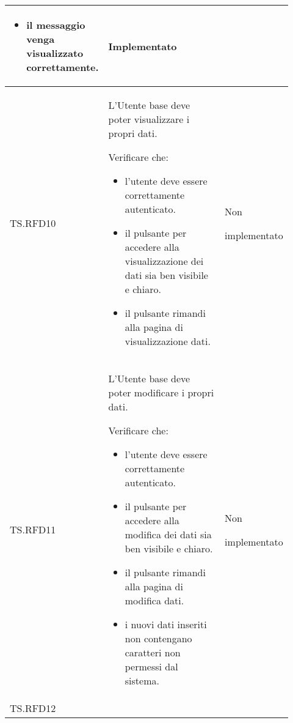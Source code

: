 \begin{longtable}{|p{0.10\linewidth}|p{0.70\linewidth}|p{0.12\linewidth}|}
\begin{itemize}
		\item il messaggio venga visualizzato correttamente.
	\end{itemize}                                      &
	Implementato                                                                                                                                                            \\
	\hline
	TS.RFD10                                                                                                                        &
	L'Utente base deve poter visualizzare i propri dati. \par
	Verificare che:
	\begin{itemize}
		\item l'utente deve essere correttamente autenticato.
		\item il pulsante per accedere alla visualizzazione dei dati sia ben visibile e chiaro.
		\item il pulsante rimandi alla pagina di visualizzazione dati.
	\end{itemize}                                         &
	Non \par implementato                                                                                                                                                   \\
	\hline
	TS.RFD11                                                                                                                        &
	L'Utente base deve poter modificare i propri dati. \par
	Verificare che:
	\begin{itemize}
		\item l'utente deve essere correttamente autenticato.
		\item il pulsante per accedere alla modifica dei dati sia ben visibile e chiaro.
		\item il pulsante rimandi alla pagina di modifica dati.
		\item i nuovi dati inseriti non contengano caratteri non permessi dal sistema.
	\end{itemize}                                                &
	Non \par implementato                                                                                                                                                   \\
	\hline
	TS.RFD12                                                                                                                        &

\end{longtable}
